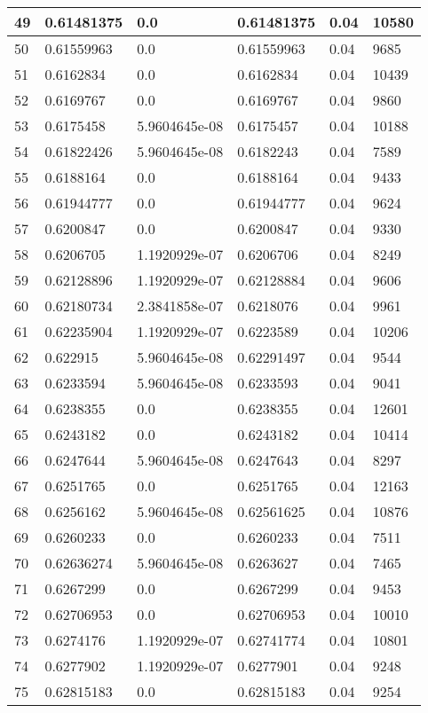 \begin{longtable}{|l|l|l|l|l|l|}
49 & 0.61481375 & 0.0 & 0.61481375 & 0.04 & 10580 \\ \hline 
50 & 0.61559963 & 0.0 & 0.61559963 & 0.04 & 9685 \\ \hline 
51 & 0.6162834 & 0.0 & 0.6162834 & 0.04 & 10439 \\ \hline 
52 & 0.6169767 & 0.0 & 0.6169767 & 0.04 & 9860 \\ \hline 
53 & 0.6175458 & 5.9604645e-08 & 0.6175457 & 0.04 & 10188 \\ \hline 
54 & 0.61822426 & 5.9604645e-08 & 0.6182243 & 0.04 & 7589 \\ \hline 
55 & 0.6188164 & 0.0 & 0.6188164 & 0.04 & 9433 \\ \hline 
56 & 0.61944777 & 0.0 & 0.61944777 & 0.04 & 9624 \\ \hline 
57 & 0.6200847 & 0.0 & 0.6200847 & 0.04 & 9330 \\ \hline 
58 & 0.6206705 & 1.1920929e-07 & 0.6206706 & 0.04 & 8249 \\ \hline 
59 & 0.62128896 & 1.1920929e-07 & 0.62128884 & 0.04 & 9606 \\ \hline 
60 & 0.62180734 & 2.3841858e-07 & 0.6218076 & 0.04 & 9961 \\ \hline 
61 & 0.62235904 & 1.1920929e-07 & 0.6223589 & 0.04 & 10206 \\ \hline 
62 & 0.622915 & 5.9604645e-08 & 0.62291497 & 0.04 & 9544 \\ \hline 
63 & 0.6233594 & 5.9604645e-08 & 0.6233593 & 0.04 & 9041 \\ \hline 
64 & 0.6238355 & 0.0 & 0.6238355 & 0.04 & 12601 \\ \hline 
65 & 0.6243182 & 0.0 & 0.6243182 & 0.04 & 10414 \\ \hline 
66 & 0.6247644 & 5.9604645e-08 & 0.6247643 & 0.04 & 8297 \\ \hline 
67 & 0.6251765 & 0.0 & 0.6251765 & 0.04 & 12163 \\ \hline 
68 & 0.6256162 & 5.9604645e-08 & 0.62561625 & 0.04 & 10876 \\ \hline 
69 & 0.6260233 & 0.0 & 0.6260233 & 0.04 & 7511 \\ \hline 
70 & 0.62636274 & 5.9604645e-08 & 0.6263627 & 0.04 & 7465 \\ \hline 
71 & 0.6267299 & 0.0 & 0.6267299 & 0.04 & 9453 \\ \hline 
72 & 0.62706953 & 0.0 & 0.62706953 & 0.04 & 10010 \\ \hline 
73 & 0.6274176 & 1.1920929e-07 & 0.62741774 & 0.04 & 10801 \\ \hline 
74 & 0.6277902 & 1.1920929e-07 & 0.6277901 & 0.04 & 9248 \\ \hline 
75 & 0.62815183 & 0.0 & 0.62815183 & 0.04 & 9254 \\ \hline 
\end{longtable}